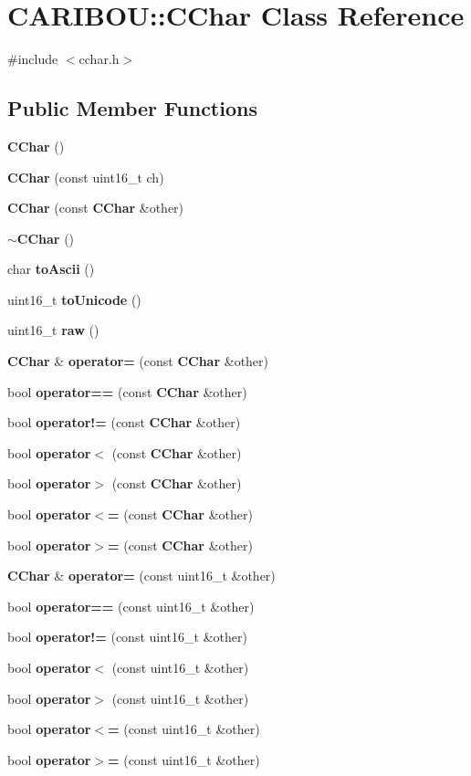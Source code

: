 \section{C\-A\-R\-I\-B\-O\-U\-:\-:C\-Char Class Reference}
\label{class_c_a_r_i_b_o_u_1_1_c_char}


{\ttfamily \#include $<$cchar.\-h$>$}

\subsection*{Public Member Functions}
\begin{DoxyCompactItemize}
\item 
{\bf C\-Char} ()
\item 
{\bf C\-Char} (const uint16\-\_\-t ch)
\item 
{\bf C\-Char} (const {\bf C\-Char} \&other)
\item 
{\bf $\sim$\-C\-Char} ()
\item 
char {\bf to\-Ascii} ()
\item 
uint16\-\_\-t {\bf to\-Unicode} ()
\item 
uint16\-\_\-t {\bf raw} ()
\item 
{\bf C\-Char} \& {\bf operator=} (const {\bf C\-Char} \&other)
\item 
bool {\bf operator==} (const {\bf C\-Char} \&other)
\item 
bool {\bf operator!=} (const {\bf C\-Char} \&other)
\item 
bool {\bf operator$<$} (const {\bf C\-Char} \&other)
\item 
bool {\bf operator$>$} (const {\bf C\-Char} \&other)
\item 
bool {\bf operator$<$=} (const {\bf C\-Char} \&other)
\item 
bool {\bf operator$>$=} (const {\bf C\-Char} \&other)
\item 
{\bf C\-Char} \& {\bf operator=} (const uint16\-\_\-t \&other)
\item 
bool {\bf operator==} (const uint16\-\_\-t \&other)
\item 
bool {\bf operator!=} (const uint16\-\_\-t \&other)
\item 
bool {\bf operator$<$} (const uint16\-\_\-t \&other)
\item 
bool {\bf operator$>$} (const uint16\-\_\-t \&other)
\item 
bool {\bf operator$<$=} (const uint16\-\_\-t \&other)
\item 
bool {\bf operator$>$=} (const uint16\-\_\-t \&other)
\end{DoxyCompactItemize}


